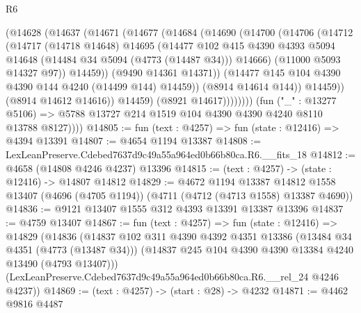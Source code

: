 \begin{lexlean}{R6}
\begin{coremodule}
                        (@14628
                          (@14637
                            (@14671
                              (@14677
                                (@14684
                                  (@14690
                                    (@14700
                                      (@14706
                                        (@14712
                                          (@14717
                                            (@14718 @14648)
                                            @14695
                                            (@14477
                                              @102
                                              @415
                                              @4390
                                              @4393
                                              @5094
                                              @14648
                                              (@14484 @34 @5094 (@4773 (@14487 @34)))
                                              @14666)
                                            (@11000 @5093 @14327 @97))
                                          @14459))
                                      (@9490 @14361 @14371))
                                    (@14477 @145 @104 @4390 @4390 @144 @4240 (@14499 @144) @14459))
                                  (@8914 @14614 @144))
                                @14459))
                            (@8914 @14612 @14616))
                          @14459)
                        (@8921 @14617))))))))
          (fun ("_" : @13277 @5106) =>
          @5788 @13727 @214 @1519 @104 @4390 @4390 @4240 @8110 @13788 @8127))))
@14805 := fun (text : @4257) => fun (state : @12416) => @4394 @13391
@14807 := @4654 @1194 @13387
@14808 := LexLeanPreserve.Cdebed7637d9c49a55a964ed0b66b80ca.R6.__fits_18
@14812 := @4658 (@14808 @4246 @4237) @13396
@14815 := (text : @4257) -> (state : @12416) -> @14807 @14812
@14829 := @4672
    @1194
    @13387
    @14812
    @1558
    @13407
    (@4696 (@4705 @1194))
    (@4711 (@4712 (@4713 @1558) @13387 @4690))
@14836 := @9121 @13407 @1555 @312 @4393 @13391 @13387 @13396
@14837 := @4759 @13407
@14867 := fun (text : @4257) =>
  fun (state : @12416) =>
  @14829
    (@14836
      (@14837
        @102
        @311
        @4390
        @4392
        @4351
        @13386
        (@13484 @34 @4351 (@4773 (@13487 @34)))
        (@14837 @245 @104 @4390 @4390 @13384 @4240 @13490 (@4793 @13407)))
      (LexLeanPreserve.Cdebed7637d9c49a55a964ed0b66b80ca.R6.__rel_24 @4246 @4237))
@14869 := (text : @4257) -> (start : @28) -> @4232
@14871 := @4462 @9816 @4487

\end{coremodule}
\end{lexlean}
